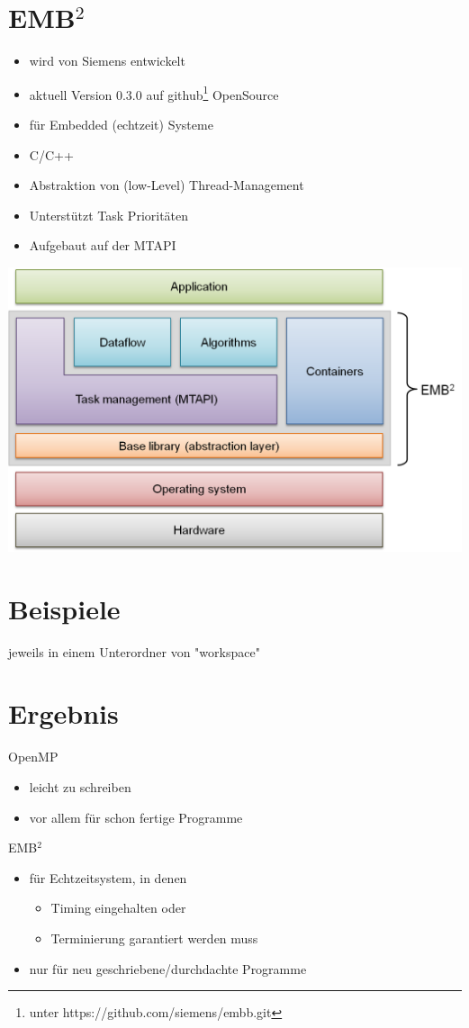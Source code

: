 \documentclass[a4paper,11pt,DIV=11]{article} %
\begin{document}
\section{EMB$ ^2$}
\begin{itemize}
	\item wird von Siemens entwickelt 
	\item aktuell Version 0.3.0 auf github\footnote{unter https://github.com/siemens/embb.git} OpenSource
	\item für Embedded (echtzeit) Systeme
	\item C/C++
	\item Abstraktion von (low-Level) Thread-Management
	\item Unterstützt Task Prioritäten
	\item Aufgebaut auf der MTAPI
\end{itemize}
\includegraphics[width=\textwidth]{img/embb.png}
\section{Beispiele}
jeweils in einem Unterordner von "workspace"
\section{Ergebnis}
OpenMP
\begin{itemize}
	\item leicht zu schreiben
	\item vor allem für schon fertige Programme
\end{itemize}
EMB$ ^2$
\begin{itemize}
	\item für Echtzeitsystem, in denen 
	\begin{itemize}
		\item Timing eingehalten oder 
		\item Terminierung garantiert werden muss
	\end{itemize}	 	
	\item nur für neu geschriebene/durchdachte Programme
\end{itemize}
\end{document}
